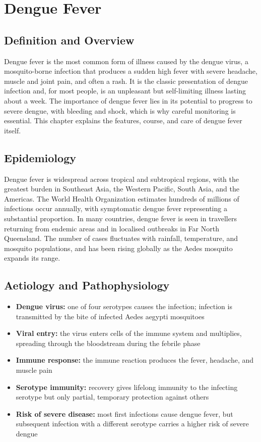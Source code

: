 \chapter{Dengue Fever}

\section*{Definition and Overview}
Dengue fever is the most common form of illness caused by the dengue virus, a mosquito-borne infection that produces a sudden high fever with severe headache, muscle and joint pain, and often a rash. It is the classic presentation of dengue infection and, for most people, is an unpleasant but self-limiting illness lasting about a week. The importance of dengue fever lies in its potential to progress to severe dengue, with bleeding and shock, which is why careful monitoring is essential. This chapter explains the features, course, and care of dengue fever itself.

\section*{Epidemiology}
Dengue fever is widespread across tropical and subtropical regions, with the greatest burden in Southeast Asia, the Western Pacific, South Asia, and the Americas. The World Health Organization estimates hundreds of millions of infections occur annually, with symptomatic dengue fever representing a substantial proportion. In many countries, dengue fever is seen in travellers returning from endemic areas and in localised outbreaks in Far North Queensland. The number of cases fluctuates with rainfall, temperature, and mosquito populations, and has been rising globally as the Aedes mosquito expands its range.

\section*{Aetiology and Pathophysiology}
\begin{itemize}
    \item \textbf{Dengue virus:} one of four serotypes causes the infection; infection is transmitted by the bite of infected Aedes aegypti mosquitoes
    \item \textbf{Viral entry:} the virus enters cells of the immune system and multiplies, spreading through the bloodstream during the febrile phase
    \item \textbf{Immune response:} the immune reaction produces the fever, headache, and muscle pain
    \item \textbf{Serotype immunity:} recovery gives lifelong immunity to the infecting serotype but only partial, temporary protection against others
    \item \textbf{Risk of severe disease:} most first infections cause dengue fever, but subsequent infection with a different serotype carries a higher risk of severe dengue
\end{itemize}

